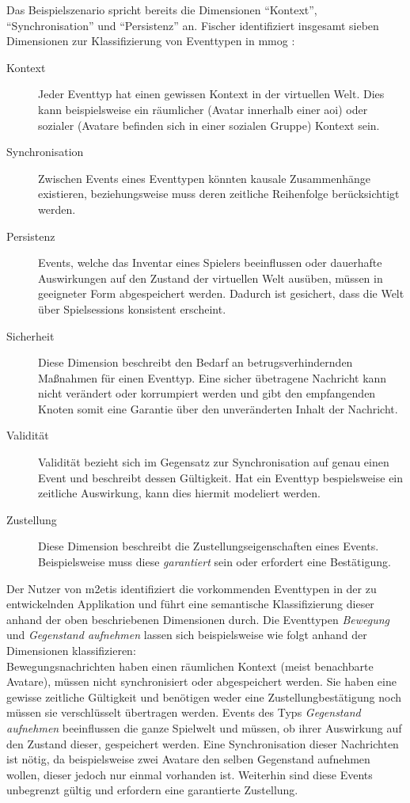 Das Beispielszenario spricht bereits die Dimensionen \enquote{Kontext}, \enquote{Synchronisation} und \enquote{Persistenz} an. Fischer identifiziert insgesamt sieben Dimensionen zur Klassifizierung von Eventtypen in \ac{mmog} \cite{Fischer2010Event}:

\begin{description}
\item[Kontext] Jeder Eventtyp hat einen gewissen Kontext in der virtuellen Welt. Dies kann beispielsweise ein räumlicher (Avatar innerhalb einer \ac{aoi}) oder sozialer (Avatare befinden sich in einer sozialen Gruppe) Kontext sein.

\item[Synchronisation] Zwischen Events eines Eventtypen könnten kausale Zusammenhänge existieren, beziehungsweise muss deren zeitliche Reihenfolge berücksichtigt werden.

\item[Persistenz] Events, welche das Inventar eines Spielers beeinflussen oder dauerhafte Auswirkungen auf den Zustand der virtuellen Welt ausüben, müssen in geeigneter Form abgespeichert werden. Dadurch ist gesichert, dass die Welt über Spielsessions konsistent erscheint.

\item[Sicherheit] Diese Dimension beschreibt den Bedarf an betrugsverhindernden Maßnahmen für einen Eventtyp. Eine sicher übetragene Nachricht kann nicht verändert oder korrumpiert werden und gibt den empfangenden Knoten somit eine Garantie über den unveränderten Inhalt der Nachricht.

\item[Validität] Validität bezieht sich im Gegensatz zur Synchronisation auf genau einen Event und beschreibt dessen Gültigkeit. Hat ein Eventtyp bespielsweise ein zeitliche Auswirkung, kann dies hiermit modeliert werden.

\item[Zustellung] Diese Dimension beschreibt die Zustellungseigenschaften eines Events. Beispielsweise muss diese \emph{garantiert} sein oder erfordert eine Bestätigung.
\end{description}

Der Nutzer von \ac{m2etis} identifiziert die vorkommenden Eventtypen in der zu entwickelnden Applikation und führt eine semantische Klassifizierung dieser anhand der oben beschriebenen Dimensionen durch. Die Eventtypen \emph{Bewegung} und \emph{Gegenstand aufnehmen} lassen sich beispielsweise wie folgt anhand der Dimensionen klassifizieren:\\
Bewegungsnachrichten haben einen räumlichen Kontext (meist benachbarte Avatare), müssen nicht synchronisiert oder abgespeichert werden. Sie haben eine gewisse zeitliche Gültigkeit und benötigen weder eine Zustellungbestätigung noch müssen sie verschlüsselt übertragen werden.
Events des Typs \emph{Gegenstand aufnehmen} beeinflussen die ganze Spielwelt und müssen, ob ihrer Auswirkung auf den Zustand dieser, gespeichert werden. Eine Synchronisation dieser Nachrichten ist nötig, da beispielsweise zwei Avatare den selben Gegenstand aufnehmen wollen, dieser jedoch nur einmal vorhanden ist. Weiterhin sind diese Events unbegrenzt gültig und erfordern eine garantierte Zustellung.

